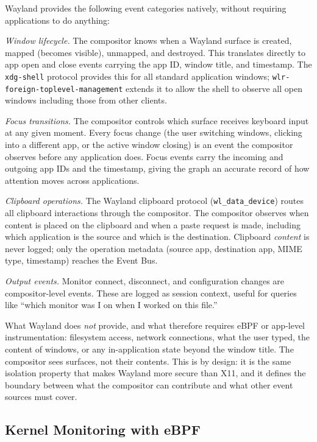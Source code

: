 Wayland provides the following event categories natively, without requiring
applications to do anything:

\emph{Window lifecycle.} The compositor knows when a Wayland surface is
created, mapped (becomes visible), unmapped, and destroyed. This translates
directly to app open and close events carrying the app ID, window title, and
timestamp. The \texttt{xdg-shell} protocol provides this for all standard
application windows; \texttt{wlr-foreign-toplevel-management} extends it to
allow the shell to observe all open windows including those from other clients.

\emph{Focus transitions.} The compositor controls which surface receives
keyboard input at any given moment. Every focus change (the user switching
windows, clicking into a different app, or the active window closing) is an
event the compositor observes before any application does. Focus events carry
the incoming and outgoing app IDs and the timestamp, giving the graph an
accurate record of how attention moves across applications.

\emph{Clipboard operations.} The Wayland clipboard protocol
(\texttt{wl\_data\_device}) routes all clipboard interactions through the
compositor. The compositor observes when content is placed on the clipboard and
when a paste request is made, including which application is the source and
which is the destination. Clipboard \emph{content} is never logged; only the
operation metadata (source app, destination app, MIME type, timestamp) reaches
the Event Bus.

\emph{Output events.} Monitor connect, disconnect, and configuration changes
are compositor-level events. These are logged as session context, useful for
queries like ``which monitor was I on when I worked on this file.''

What Wayland does \emph{not} provide, and what therefore requires eBPF or
app-level instrumentation: filesystem access, network connections, what the
user typed, the content of windows, or any in-application state beyond the
window title. The compositor sees surfaces, not their contents. This is by
design: it is the same isolation property that makes Wayland more secure than
X11, and it defines the boundary between what the compositor can contribute
and what other event sources must cover.

\subsection{Kernel Monitoring with eBPF}
\label{sec:ebpf}

